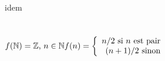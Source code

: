 \documentclass[a4paper]{article}
\begin{document}
\section{}
idem

\section{}
\begin{math}
f(\mathbb{N}) = \mathbb{Z} $, $ n \in \mathbb{N}
f(n) = 
\left\{
\begin{array}{rcr}
  n/2 $ si $ n $ est pair$ \\
  (n+1)/2 $ sinon$
\end{array}
\right.\\
\end{math}
\end{document}
